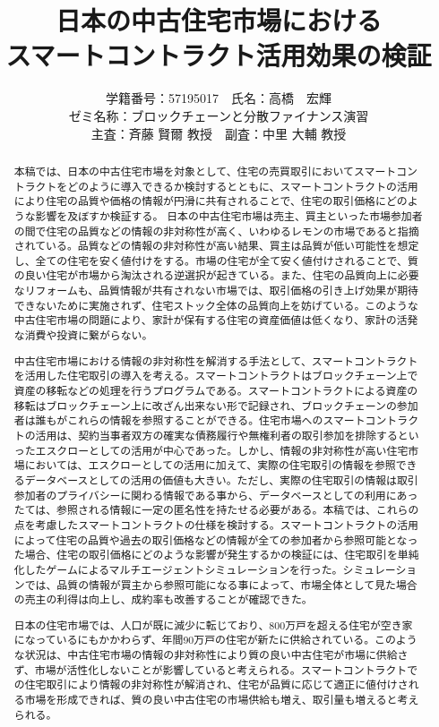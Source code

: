 \documentclass[a4paper,fontsize=11pt,report,notitlepage,line_length=38zw,number_of_lines=40,dvipdfmx]{jlreq}
\title{日本の中古住宅市場における\\スマートコントラクト活用効果の検証}
\author{
学籍番号：57195017　氏名：高橋　宏輝
\\ゼミ名称：ブロックチェーンと分散ファイナンス演習
\\主査：斉藤 賢爾 教授　副査：中里 大輔 教授}
\begin{document}
\date{}
\maketitle
\begin{abstract}
本稿では、日本の中古住宅市場を対象として、住宅の売買取引においてスマートコントラクトをどのように導入できるか検討するとともに、スマートコントラクトの活用により住宅の品質や価格の情報が円滑に共有されることで、住宅の取引価格にどのような影響を及ぼすか検証する。
日本の中古住宅市場は売主、買主といった市場参加者の間で住宅の品質などの情報の非対称性が高く、いわゆるレモンの市場であると指摘されている。品質などの情報の非対称性が高い結果、買主は品質が低い可能性を想定し、全ての住宅を安く値付けをする。市場の住宅が全て安く値付けされることで、質の良い住宅が市場から淘汰される逆選択が起きている。また、住宅の品質向上に必要なリフォームも、品質情報が共有されない市場では、取引価格の引き上げ効果が期待できないために実施されず、住宅ストック全体の品質向上を妨げている。このような中古住宅市場の問題により、家計が保有する住宅の資産価値は低くなり、家計の活発な消費や投資に繋がらない。

中古住宅市場における情報の非対称性を解消する手法として、スマートコントラクトを活用した住宅取引の導入を考える。スマートコントラクトはブロックチェーン上で資産の移転などの処理を行うプログラムである。スマートコントラクトによる資産の移転はブロックチェーン上に改ざん出来ない形で記録され、ブロックチェーンの参加者は誰もがこれらの情報を参照することができる。住宅市場へのスマートコントラクトの活用は、契約当事者双方の確実な債務履行や無権利者の取引参加を排除するといったエスクローとしての活用が中心であった。しかし、情報の非対称性が高い住宅市場においては、エスクローとしての活用に加えて、実際の住宅取引の情報を参照できるデータベースとしての活用の価値も大きい。ただし、実際の住宅取引の情報は取引参加者のプライバシーに関わる情報である事から、データベースとしての利用にあったては、参照される情報に一定の匿名性を持たせる必要がある。本稿では、これらの点を考慮したスマートコントラクトの仕様を検討する。スマートコントラクトの活用によって住宅の品質や過去の取引価格などの情報が全ての参加者から参照可能となった場合、住宅の取引価格にどのような影響が発生するかの検証には、住宅取引を単純化したゲームによるマルチエージェントシミュレーションを行った。シミュレーションでは、品質の情報が買主から参照可能になる事によって、市場全体として見た場合の売主の利得は向上し、成約率も改善することが確認できた。

日本の住宅市場では、人口が既に減少に転じており、800万戸を超える住宅が空き家になっているにもかかわらず、年間90万戸の住宅が新たに供給されている。このような状況は、中古住宅市場の情報の非対称性により質の良い中古住宅が市場に供給さず、市場が活性化しないことが影響していると考えられる。スマートコントラクトでの住宅取引により情報の非対称性が解消され、住宅が品質に応じて適正に値付けされる市場を形成できれば、質の良い中古住宅の市場供給も増え、取引量も増えると考えられる。

\end{abstract}
\end{document}
